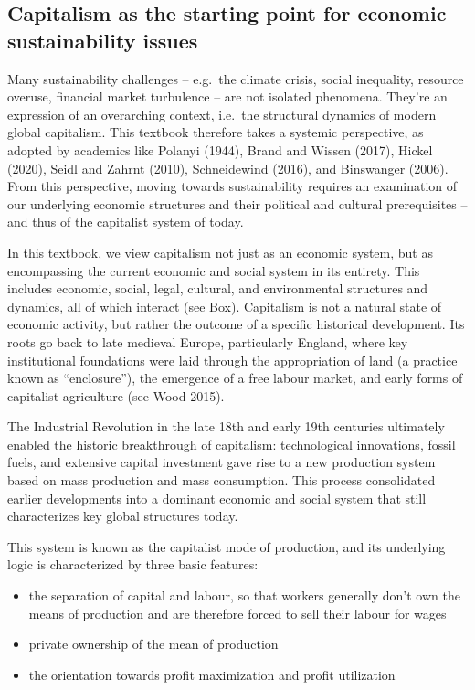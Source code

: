 \documentclass[
  a4paper,
  openany]{book}
\begin{document}
\subsection{Capitalism as the starting point for economic sustainability
issues}\label{capitalism-as-the-starting-point-for-economic-sustainability-issues}

Many sustainability challenges -- e.g.~the climate crisis, social
inequality, resource overuse, financial market turbulence -- are not
isolated phenomena. They're an expression of an overarching context,
i.e.~the structural dynamics of modern global capitalism. This textbook
therefore takes a systemic perspective, as adopted by academics like
Polanyi (1944), Brand and Wissen (2017), Hickel (2020), Seidl and Zahrnt
(2010), Schneidewind (2016), and Binswanger (2006). From this
perspective, moving towards sustainability requires an examination of
our underlying economic structures and their political and cultural
prerequisites -- and thus of the capitalist system of today.

In this textbook, we view capitalism not just as an economic system, but
as encompassing the current economic and social system in its entirety.
This includes economic, social, legal, cultural, and environmental
structures and dynamics, all of which interact (see Box). Capitalism is
not a natural state of economic activity, but rather the outcome of a
specific historical development. Its roots go back to late medieval
Europe, particularly England, where key institutional foundations were
laid through the appropriation of land (a practice known as
``enclosure''), the emergence of a free labour market, and early forms
of capitalist agriculture (see Wood 2015).

The Industrial Revolution in the late 18th and early 19th centuries
ultimately enabled the historic breakthrough of capitalism:
technological innovations, fossil fuels, and extensive capital
investment gave rise to a new production system based on mass production
and mass consumption. This process consolidated earlier developments
into a dominant economic and social system that still characterizes key
global structures today.

This system is known as the capitalist mode of production, and its
underlying logic is characterized by three basic features:

\begin{itemize}
\item
  the separation of capital and labour, so that workers generally don't
  own the means of production and are therefore forced to sell their
  labour for wages
\item
  private ownership of the mean of production
\item
  the orientation towards profit maximization and profit utilization
\end{itemize}
\end{document}
